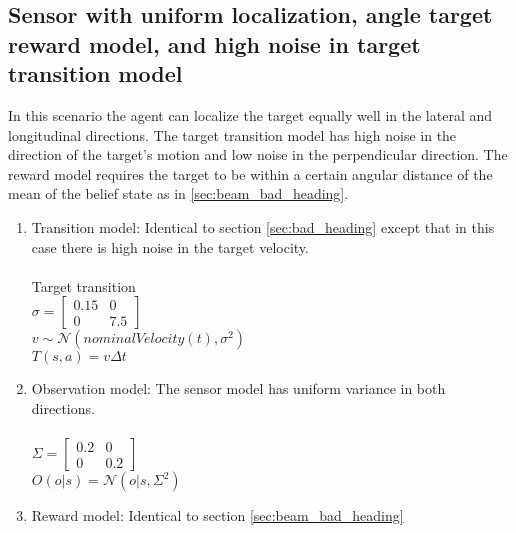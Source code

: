 	\subsection{Sensor with uniform localization, angle target reward model, and high noise in target transition model \label{sec:high_vel_noise}}
	In this scenario the agent can localize the target equally well in the lateral and longitudinal directions. The target transition model has high noise in the direction of the target's motion and low noise in the perpendicular direction. The reward model requires the target to be within a certain angular distance of the mean of the belief state as in \ref{sec:beam_bad_heading}.
		\begin{enumerate}[label=(\alph*)]
		\item Transition model: Identical to section \ref{sec:bad_heading} except that in this case there is high noise in the target velocity.\\\\
		Target transition\\
			$\sigma = \begin{bmatrix}
						  0.15 & 0 \\
						  0 & 7.5
						 \end{bmatrix}$\\
			$v \sim \mathcal{N} ( nominalVelocity(t),\sigma^2)$\\
			$T(s,a) = v\Delta t$\\
		\item Observation model: The sensor model has uniform variance in both directions.\\\\
		$\Sigma = \begin{bmatrix}
						  0.2 & 0 \\
						  0 & 0.2
						 \end{bmatrix}$\\
		$O(o|s) = \mathcal{N} ( o | s,\Sigma^2)$\\
		\item Reward model: Identical to section \ref{sec:beam_bad_heading}
		\end{enumerate}
		
\break

